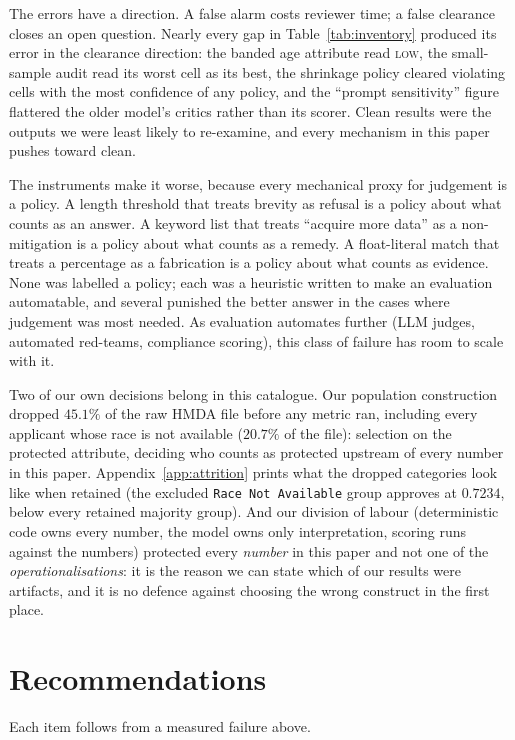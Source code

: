 \documentclass[sigconf,nonacm]{acmart}
\begin{document}
The errors have a direction. A false alarm costs
reviewer time; a false clearance closes an open question. Nearly every gap in
Table~\ref{tab:inventory} produced its error in the clearance direction: the
banded age attribute read \textsc{low}, the small-sample audit read its worst
cell as its best, the shrinkage policy cleared violating cells with the most
confidence of any policy, and the ``prompt sensitivity'' figure flattered the
older model's critics rather than its scorer. Clean results were the outputs
we were least likely to re-examine, and every mechanism in this paper pushes
toward clean.

The instruments make it worse, because every mechanical proxy for judgement is
a policy. A length threshold that treats brevity as refusal is a policy about
what counts as an answer. A keyword list that treats ``acquire more data'' as
a non-mitigation is a policy about what counts as a remedy. A float-literal
match that treats a percentage as a fabrication is a policy about what counts
as evidence. None was labelled a policy; each was a heuristic written to make
an evaluation automatable, and several punished the better answer in the cases
where judgement was most needed. As evaluation automates further (LLM
judges, automated red-teams, compliance scoring), this class of failure has
room to scale with it.

Two of our own decisions belong in this catalogue. Our population construction
dropped $45.1\%$ of the raw HMDA file before any metric ran, including every
applicant whose race is not available ($20.7\%$ of the file): selection on
the protected attribute, deciding who counts as protected upstream of every
number in this paper. Appendix~\ref{app:attrition} prints what the dropped
categories look like when retained (the excluded \texttt{Race Not Available}
group approves at $0.7234$, below every retained majority group). And our
division of labour (deterministic code owns every number, the model owns
only interpretation, scoring runs against the numbers) protected every
\emph{number} in this paper and not one of the \emph{operationalisations}: it
is the reason we can state which of our results were artifacts, and it is no
defence against choosing the wrong construct in the first place.

\section{Recommendations}
\label{sec:protocol}

Each item follows from a measured failure above.
\end{document}
